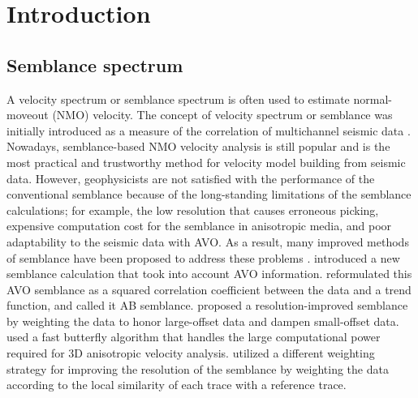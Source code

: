\section{Introduction}
 \subsection{Semblance spectrum}
A velocity spectrum or semblance spectrum is often used to estimate normal-moveout (NMO) velocity. The concept of velocity spectrum or semblance was initially introduced as a measure of the correlation of multichannel seismic data \cite[]{Taner69,Neidell71}. Nowadays, semblance-based NMO velocity analysis is still popular and is the most practical and trustworthy method for velocity model building from seismic data. However, geophysicists are not satisfied with the performance of the conventional semblance because of the long-standing limitations of the semblance calculations; for example, the low resolution that causes erroneous picking, expensive computation cost for the semblance in anisotropic media, and poor adaptability to the seismic data with AVO. As a result, many improved methods of semblance have been proposed to address these problems \cite[]{Sarkar01,Sarkar02,Fomel09,Luo12,Hu15,Chen15}. 
\cite{Sarkar01,Sarkar02} introduced a new semblance calculation that took into account AVO information. \cite{Fomel09} reformulated this AVO semblance as a squared correlation coefficient between the data and a trend function, and called it AB semblance. \cite{Luo12} proposed a resolution-improved semblance by weighting the data to honor large-offset data and dampen small-offset data. \cite{Hu15} used a fast butterfly algorithm that handles the large computational power required for 3D anisotropic velocity analysis. \cite{Chen15} utilized a different weighting strategy for improving the resolution of the semblance by weighting the data according to the local similarity of each trace with a reference trace. 

